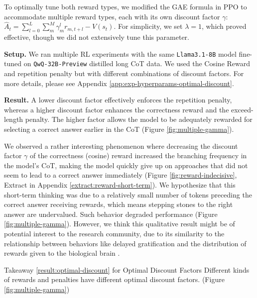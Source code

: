 To optimally tune both reward types, we modified the GAE formula in PPO to accommodate multiple reward types, each with its own discount factor $\gamma$: $\hat{A}_t = \sum_{l=0}^{L} \sum_{m}^{M}\gamma_{m}^l r_{m, t + l} - V(s_t)$. For simplicity, we set $\lambda = 1$, which proved effective, though we did not extensively tune this parameter.

\noindent\textbf{Setup.} We ran multiple RL experiments with the same \texttt{Llama3.1-8B} model fine-tuned on \texttt{QwQ-32B-Preview} distilled long CoT data. We used the Cosine Reward and repetition penalty but with different combinations of discount factors. For more details, please see Appendix \ref{app:exp-hyperparams-optimal-discount}.

\noindent\textbf{Result.} A lower discount factor effectively enforces the repetition penalty, whereas a higher discount factor enhances the correctness reward and the exceed-length penalty. The higher factor allows the model to be adequately rewarded for selecting a correct answer earlier in the CoT (Figure \ref{fig:multiple-gamma}).

We observed a rather interesting phenomenon where decreasing the discount factor $\gamma$ of the correctness (cosine) reward increased the branching frequency in the model's CoT, making the model quickly give up on approaches that did not seem to lead to a correct answer immediately (Figure \ref{fig:reward-indecisive}, Extract in Appendix \ref{extract:reward-short-term}). We hypothesize that this short-term thinking was due to a relatively small number of tokens preceding the correct answer receiving rewards, which means stepping stones to the right answer are undervalued. Such behavior degraded performance (Figure \ref{fig:multiple-gamma}). However, we think this qualitative result might be of potential interest to the research community, due to its similarity to the relationship between behaviors like delayed gratification and the distribution of rewards given to the biological brain \cite{doi:10.1126/sciadv.abg6611}.



\begin{AIbox}{Takeaway \hypersetup{hidelinks}\ref{result:optimal-discount} for Optimal Discount Factors}
Different kinds of rewards and penalties have different optimal discount factors. (Figure \ref{fig:multiple-gamma})
\end{AIbox}

